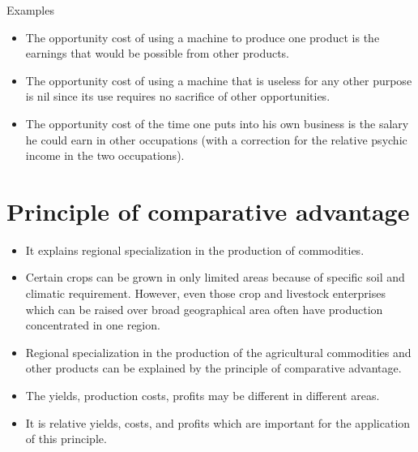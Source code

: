 \documentclass[12pt,ignorenonframetext,aspectratio=169]{beamer}
\providecommand{\tightlist}{%
  \setlength{\itemsep}{0pt}\setlength{\parskip}{0pt}}
\begin{document}
\begin{frame}{Examples}
\protect\hypertarget{examples}{}
\begin{itemize}
\tightlist
\item
  The opportunity cost of using a machine to produce one product is the
  earnings that would be possible from other products.
\item
  The opportunity cost of using a machine that is useless for any other
  purpose is nil since its use requires no sacrifice of other
  opportunities.
\item
  The opportunity cost of the time one puts into his own business is the
  salary he could earn in other occupations (with a correction for the
  relative psychic income in the two occupations).
\end{itemize}
\end{frame}

\hypertarget{principle-of-comparative-advantage}{%
\section{Principle of comparative
advantage}\label{principle-of-comparative-advantage}}

\begin{frame}{}
\protect\hypertarget{section-6}{}
\begin{itemize}
\tightlist
\item
  It explains regional specialization in the production of commodities.
\item
  Certain crops can be grown in only limited areas because of specific
  soil and climatic requirement. However, even those crop and livestock
  enterprises which can be raised over broad geographical area often
  have production concentrated in one region.
\item
  Regional specialization in the production of the agricultural
  commodities and other products can be explained by the principle of
  comparative advantage.
\item
  The yields, production costs, profits may be different in different
  areas.
\item
  It is relative yields, costs, and profits which are important for the
  application of this principle.
\end{itemize}
\end{frame}
\end{document}
